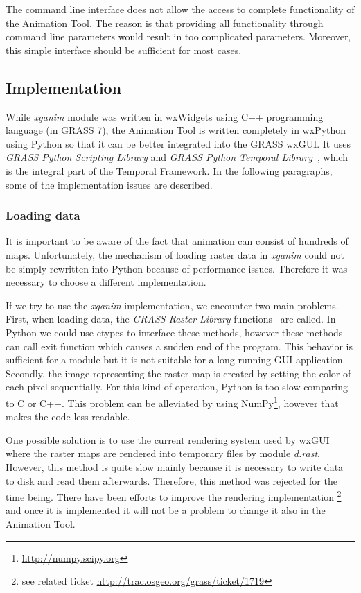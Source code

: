 \documentclass[a4paper,12pt,oneside]{book}
\newcommand{\module}[1]{\textsl{#1}}
\newcommand{\tf}{Temporal Framework\xspace}
\newcommand{\at}{Animation Tool\xspace}
\begin{document}
The command line interface does not allow the access to complete functionality of the \at.
The reason is that providing all functionality through command line parameters
would result in too complicated parameters.
Moreover, this simple interface should be sufficient for most cases.


\subsection{Implementation}
While \module{xganim} module was written in wxWidgets using C++ programming language (in GRASS 7),
the \at is written completely in wxPython using Python so that it can be better integrated into the GRASS wxGUI.
It uses \emph{GRASS Python Scripting Library} and \emph{GRASS Python Temporal Library}~\cite{grassProgMan},
which is the integral part of the \tf. In the following paragraphs, some of the implementation issues are described.

\subsubsection{Loading data}
It is important to be aware of the fact that animation can consist of hundreds of maps.
Unfortunately, the mechanism of loading raster data in \module{xganim} could not be simply
rewritten into Python because of performance issues.
Therefore it was necessary to choose a different implementation.

If we try to use the \module{xganim} implementation, we encounter two main problems.
First, when loading data, the \emph{GRASS Raster Library} functions~\cite{grassProgMan} are called.
In Python we could use ctypes to interface these methods,
however these methods can call exit function which causes a sudden end of the program.
This behavior is sufficient for a module but it is not suitable for a long running GUI application.
Secondly, the image representing the raster map is created by setting the color of each pixel sequentially.
For this kind of operation, Python is too slow comparing to C or C++.
This problem can be alleviated by using NumPy\footnote{\url{http://numpy.scipy.org}},
however that makes the code less readable.

One possible solution is to use the current rendering system used by wxGUI
where the raster maps are rendered into temporary files by module \module{d.rast}.
However, this method is quite slow mainly because it is necessary to write data to disk and read them afterwards.
Therefore, this method was rejected for the time being.
There have been efforts to improve the rendering implementation%
\footnote{see related ticket \url{http://trac.osgeo.org/grass/ticket/1719}}
and once it is implemented it will not be a problem to change it also in the \at.
\end{document}
